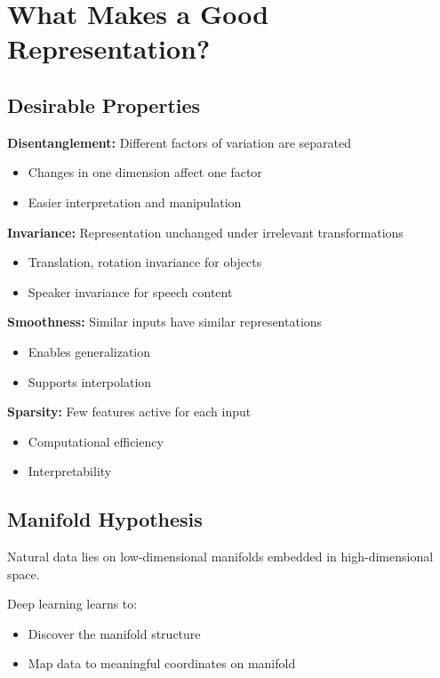 
\section{What Makes a Good Representation?}
\label{sec:good-representations}

\subsection{Desirable Properties}

\textbf{Disentanglement:} Different factors of variation are separated
\begin{itemize}
    \item Changes in one dimension affect one factor
    \item Easier interpretation and manipulation
\end{itemize}

\textbf{Invariance:} Representation unchanged under irrelevant transformations
\begin{itemize}
    \item Translation, rotation invariance for objects
    \item Speaker invariance for speech content
\end{itemize}

\textbf{Smoothness:} Similar inputs have similar representations
\begin{itemize}
    \item Enables generalization
    \item Supports interpolation
\end{itemize}

\textbf{Sparsity:} Few features active for each input
\begin{itemize}
    \item Computational efficiency
    \item Interpretability
\end{itemize}

\subsection{Manifold Hypothesis}

Natural data lies on low-dimensional manifolds embedded in high-dimensional space.

Deep learning learns to:
\begin{itemize}
    \item Discover the manifold structure
    \item Map data to meaningful coordinates on manifold
\end{itemize}

